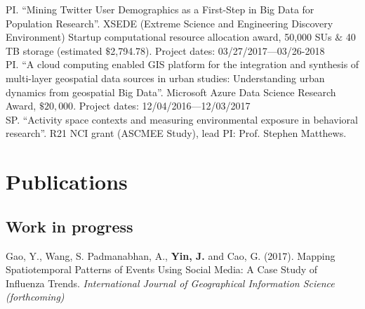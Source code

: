 \documentclass[11pt, a4paper]{article}
\newcommand{\years}[1]{\marginnote{\scriptsize #1}}
\begin{document}
PI. ``Mining Twitter User Demographics as a First-Step in Big Data for Population Research''. XSEDE (Extreme
Science and Engineering Discovery Environment) Startup computational resource allocation award, 50,000 SUs $\&$ 40 TB storage (estimated $\$$2,794.78). Project dates: 03/27/2017—03/26-2018\\

PI. ``A cloud computing enabled GIS platform for the integration and synthesis of multi-layer geospatial data
sources in urban studies: Understanding urban dynamics from geospatial Big Data''. Microsoft Azure Data
Science Research Award, $\$20,000$. Project dates: 12/04/2016—12/03/2017\\

SP. ``Activity space contexts and measuring environmental exposure in behavioral research''. R21 NCI grant (ASCMEE Study), lead PI: Prof. Stephen Matthews.

\section*{Publications}
\subsection*{Work in progress}
\years{2017}Gao, Y., Wang, S. Padmanabhan, A., \textbf{Yin, J.} and Cao, G. (2017). Mapping Spatiotemporal Patterns of Events Using Social Media: A Case Study of Influenza Trends. \emph{International Journal of Geographical Information Science (forthcoming)}\\
\end{document}
